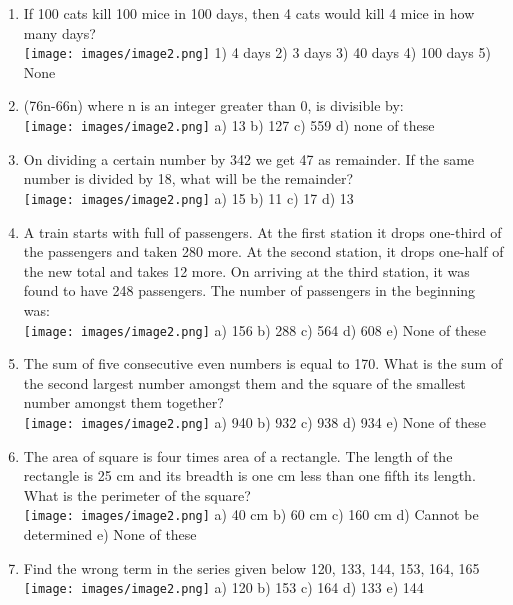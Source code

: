\documentclass[
]{article}
\begin{document}
\begin{enumerate}
\item If 100 cats kill 100 mice in 100 days, then 4 cats would kill 4 mice in how many days? \\
\texttt{[image: images/image2.png]} 1) 4 days 	2) 3 days 	3) 40 days 	4) 100 days 	5) None
\item (76n-66n) where n is an integer greater than 0, is divisible by: \\
\texttt{[image: images/image2.png]} a) 13 	b) 127 	c) 559 	d) none of these
	\item On dividing a certain number by 342 we get 47 as remainder. If the same number is divided by 18, what will be the remainder? \\
\texttt{[image: images/image2.png]} a) 15 	b) 11 	c) 17 	d) 13
\item A train starts with full of passengers. At the first station it drops one-third of the passengers and taken 280 more. At the second station, it drops one-half of the new total and takes 12 more. On arriving at the third station, it was found to have 248 passengers. The number of
passengers in the beginning was: \\
\texttt{[image: images/image2.png]} a) 156 	b) 288 	c) 564 	d) 608 	e) None of these
\item The sum of five consecutive even numbers is equal to 170. What is the sum of the second largest number amongst them and the square of the smallest number amongst them together? \\
\texttt{[image: images/image2.png]} a) 940 	b) 932 	c) 938 	d) 934 	e) None of these
\item The area of square is four times area of a rectangle. The length of the rectangle is 25 cm and its breadth is one cm less than one fifth its length. What is the perimeter of the square? \\
\texttt{[image: images/image2.png]} a) 40 cm 	b) 60 cm 	c) 160 cm d) Cannot be determined 	e) None of these
\item Find the wrong term in the series given below 120, 133, 144, 153, 164, 165 	 \\
\texttt{[image: images/image2.png]} a) 120 	b) 153 c) 164 d) 133 e) 144




\end{enumerate}
\end{document}

